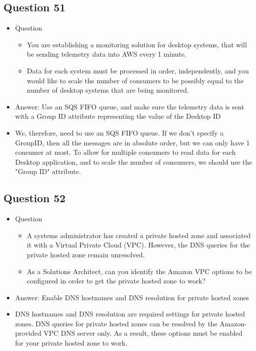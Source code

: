 \documentclass[]{scrartcl}
\begin{document}
\subsection{Question 51}
\begin{itemize}
	\item Question
	\begin{itemize}
		\item You are establishing a monitoring solution for desktop systems, that will be sending telemetry data into AWS every 1 minute. 
		\item Data for each system must be processed in order, independently, and you would like to scale the number of consumers to be possibly equal to the number of desktop systems that are being monitored.
	\end{itemize}
	\item Answer: Use an SQS FIFO queue, and make sure the telemetry data is sent with a Group ID attribute representing the value of the Desktop ID
	\item We, therefore, need to use an SQS FIFO queue. If we don't specify a GroupID, then all the messages are in absolute order, but we can only have 1 consumer at most. To allow for multiple consumers to read data for each Desktop application, and to scale the number of consumers, we should use the "Group ID" attribute. 
\end{itemize}

\subsection{Question 52}
\begin{itemize}
	\item Question
	\begin{itemize}
		\item A systems administrator has created a private hosted zone and associated it with a Virtual Private Cloud (VPC). However, the DNS queries for the private hosted zone remain unresolved.
		\item As a Solutions Architect, can you identify the Amazon VPC options to be configured in order to get the private hosted zone to work?
	\end{itemize}
	\item Answer: Enable DNS hostnames and DNS resolution for private hosted zones
	\item  DNS hostnames and DNS resolution are required settings for private hosted zones. DNS queries for private hosted zones can be resolved by the Amazon-provided VPC DNS server only. As a result, these options must be enabled for your private hosted zone to work.
\end{itemize}
\end{document}

